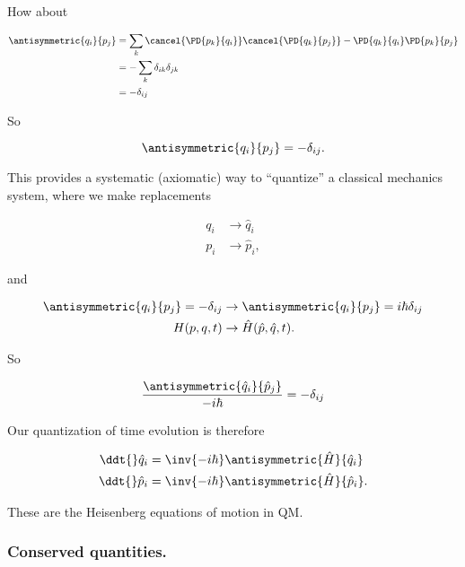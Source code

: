 How about

\begin{align*}
\antisymmetric{q_i}{p_j} 
&= 
\sum_k
\cancel{
\PD{p_k}{q_i}
}
\cancel{
\PD{q_k}{p_j}
}
-
\PD{q_k}{q_i}
\PD{p_k}{p_j} \\
&= 
-
\sum_k
\delta_{ik}
\delta_{jk} \\
&=
-\delta_{ij}
\end{align*}

So 

\begin{equation}\label{eqn:phaseSpaceAndTrajectories:190}
\antisymmetric{q_i}{p_j} = -\delta_{ij}.
\end{equation}

This provides a systematic (axiomatic) way to ``quantize'' a classical mechanics system, where we make replacements

\begin{align}\label{eqn:phaseSpaceAndTrajectories:210}
q_i &\rightarrow \hat{q}_i \\
p_i &\rightarrow \hat{p}_i,
\end{align}

and

\begin{align}\label{eqn:phaseSpaceAndTrajectories:230}
\antisymmetric{q_i}{p_j} = -\delta_{ij} &\rightarrow 
\antisymmetric{q_i}{p_j} = i \hbar \delta_{ij} \\
H(p, q, t) &\rightarrow \hat{H}(\hat{p}, \hat{q}, t).
\end{align}

So 

\begin{equation}\label{eqn:phaseSpaceAndTrajectories:250}
\frac{\antisymmetric{\hat{q}_i}{\hat{p}_j}}{-i \hbar } = - \delta_{ij}
\end{equation}

Our quantization of time evolution is therefore

\begin{align}\label{eqn:phaseSpaceAndTrajectories:270}
\ddt{} \hat{q}_i &= \inv{-i\hbar} \antisymmetric{\hat{H}}{\hat{q}_i} \\
\ddt{} \hat{p}_i &= \inv{-i\hbar} \antisymmetric{\hat{H}}{\hat{p}_i}.
\end{align}

These are the Heisenberg equations of motion in QM.

\subsubsection{Conserved quantities.}

